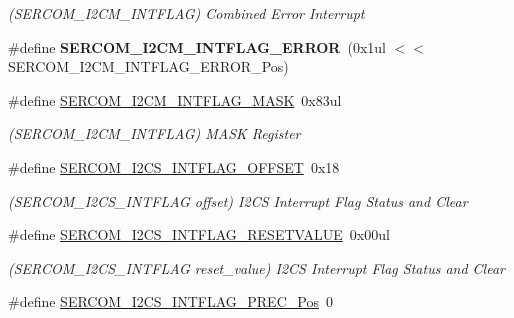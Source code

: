 \begin{DoxyCompactItemize}
\begin{DoxyCompactList}\small\item\em (S\+E\+R\+C\+O\+M\+\_\+\+I2\+C\+M\+\_\+\+I\+N\+T\+F\+L\+A\+G) Combined Error Interrupt \end{DoxyCompactList}\item 
\hypertarget{group___s_a_m_l21___s_e_r_c_o_m_ga45b3df062596b7d41a4df80a384dbe8c}{}\#define {\bfseries S\+E\+R\+C\+O\+M\+\_\+\+I2\+C\+M\+\_\+\+I\+N\+T\+F\+L\+A\+G\+\_\+\+E\+R\+R\+O\+R}~(0x1ul $<$$<$ S\+E\+R\+C\+O\+M\+\_\+\+I2\+C\+M\+\_\+\+I\+N\+T\+F\+L\+A\+G\+\_\+\+E\+R\+R\+O\+R\+\_\+\+Pos)\label{group___s_a_m_l21___s_e_r_c_o_m_ga45b3df062596b7d41a4df80a384dbe8c}

\item 
\hypertarget{group___s_a_m_l21___s_e_r_c_o_m_ga90850c74e4bd0d0fee5fad6a0f66f798}{}\#define \hyperlink{group___s_a_m_l21___s_e_r_c_o_m_ga90850c74e4bd0d0fee5fad6a0f66f798}{S\+E\+R\+C\+O\+M\+\_\+\+I2\+C\+M\+\_\+\+I\+N\+T\+F\+L\+A\+G\+\_\+\+M\+A\+S\+K}~0x83ul\label{group___s_a_m_l21___s_e_r_c_o_m_ga90850c74e4bd0d0fee5fad6a0f66f798}

\begin{DoxyCompactList}\small\item\em (S\+E\+R\+C\+O\+M\+\_\+\+I2\+C\+M\+\_\+\+I\+N\+T\+F\+L\+A\+G) M\+A\+S\+K Register \end{DoxyCompactList}\item 
\hypertarget{group___s_a_m_l21___s_e_r_c_o_m_gad9c846981d24d8d0c070acc9bf92faeb}{}\#define \hyperlink{group___s_a_m_l21___s_e_r_c_o_m_gad9c846981d24d8d0c070acc9bf92faeb}{S\+E\+R\+C\+O\+M\+\_\+\+I2\+C\+S\+\_\+\+I\+N\+T\+F\+L\+A\+G\+\_\+\+O\+F\+F\+S\+E\+T}~0x18\label{group___s_a_m_l21___s_e_r_c_o_m_gad9c846981d24d8d0c070acc9bf92faeb}

\begin{DoxyCompactList}\small\item\em (S\+E\+R\+C\+O\+M\+\_\+\+I2\+C\+S\+\_\+\+I\+N\+T\+F\+L\+A\+G offset) I2\+C\+S Interrupt Flag Status and Clear \end{DoxyCompactList}\item 
\hypertarget{group___s_a_m_l21___s_e_r_c_o_m_ga260614203fbaa36e1c30255bdc658541}{}\#define \hyperlink{group___s_a_m_l21___s_e_r_c_o_m_ga260614203fbaa36e1c30255bdc658541}{S\+E\+R\+C\+O\+M\+\_\+\+I2\+C\+S\+\_\+\+I\+N\+T\+F\+L\+A\+G\+\_\+\+R\+E\+S\+E\+T\+V\+A\+L\+U\+E}~0x00ul\label{group___s_a_m_l21___s_e_r_c_o_m_ga260614203fbaa36e1c30255bdc658541}

\begin{DoxyCompactList}\small\item\em (S\+E\+R\+C\+O\+M\+\_\+\+I2\+C\+S\+\_\+\+I\+N\+T\+F\+L\+A\+G reset\+\_\+value) I2\+C\+S Interrupt Flag Status and Clear \end{DoxyCompactList}\item 
\hypertarget{group___s_a_m_l21___s_e_r_c_o_m_gad0857b3c502af02c43f8309acaccfc64}{}\#define \hyperlink{group___s_a_m_l21___s_e_r_c_o_m_gad0857b3c502af02c43f8309acaccfc64}{S\+E\+R\+C\+O\+M\+\_\+\+I2\+C\+S\+\_\+\+I\+N\+T\+F\+L\+A\+G\+\_\+\+P\+R\+E\+C\+\_\+\+Pos}~0\label{group___s_a_m_l21___s_e_r_c_o_m_gad0857b3c502af02c43f8309acaccfc64}


\end{DoxyCompactItemize}
